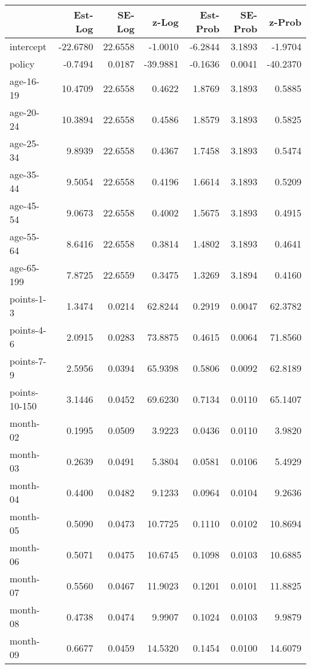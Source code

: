 \documentclass[10pt]{article}
\begin{document}
\begin{table}[ht]
\centering
\begin{tabular}{lrrrrrr}
  \hline
 & Est-Log & SE-Log & z-Log & Est-Prob & SE-Prob & z-Prob \\ 
  \hline
intercept & -22.6780 & 22.6558 & -1.0010 & -6.2844 & 3.1893 & -1.9704 \\ 
  policy & -0.7494 & 0.0187 & -39.9881 & -0.1636 & 0.0041 & -40.2370 \\ 
  age-16-19 & 10.4709 & 22.6558 & 0.4622 & 1.8769 & 3.1893 & 0.5885 \\ 
  age-20-24 & 10.3894 & 22.6558 & 0.4586 & 1.8579 & 3.1893 & 0.5825 \\ 
  age-25-34 & 9.8939 & 22.6558 & 0.4367 & 1.7458 & 3.1893 & 0.5474 \\ 
  age-35-44 & 9.5054 & 22.6558 & 0.4196 & 1.6614 & 3.1893 & 0.5209 \\ 
  age-45-54 & 9.0673 & 22.6558 & 0.4002 & 1.5675 & 3.1893 & 0.4915 \\ 
  age-55-64 & 8.6416 & 22.6558 & 0.3814 & 1.4802 & 3.1893 & 0.4641 \\ 
  age-65-199 & 7.8725 & 22.6559 & 0.3475 & 1.3269 & 3.1894 & 0.4160 \\ 
  points-1-3 & 1.3474 & 0.0214 & 62.8244 & 0.2919 & 0.0047 & 62.3782 \\ 
  points-4-6 & 2.0915 & 0.0283 & 73.8875 & 0.4615 & 0.0064 & 71.8560 \\ 
  points-7-9 & 2.5956 & 0.0394 & 65.9398 & 0.5806 & 0.0092 & 62.8189 \\ 
  points-10-150 & 3.1446 & 0.0452 & 69.6230 & 0.7134 & 0.0110 & 65.1407 \\ 
  month-02 & 0.1995 & 0.0509 & 3.9223 & 0.0436 & 0.0110 & 3.9820 \\ 
  month-03 & 0.2639 & 0.0491 & 5.3804 & 0.0581 & 0.0106 & 5.4929 \\ 
  month-04 & 0.4400 & 0.0482 & 9.1233 & 0.0964 & 0.0104 & 9.2636 \\ 
  month-05 & 0.5090 & 0.0473 & 10.7725 & 0.1110 & 0.0102 & 10.8694 \\ 
  month-06 & 0.5071 & 0.0475 & 10.6745 & 0.1098 & 0.0103 & 10.6885 \\ 
  month-07 & 0.5560 & 0.0467 & 11.9023 & 0.1201 & 0.0101 & 11.8825 \\ 
  month-08 & 0.4738 & 0.0474 & 9.9907 & 0.1024 & 0.0103 & 9.9879 \\ 
  month-09 & 0.6677 & 0.0459 & 14.5320 & 0.1454 & 0.0100 & 14.6079 \\ 

\end{tabular}
\end{table}
\end{document}
